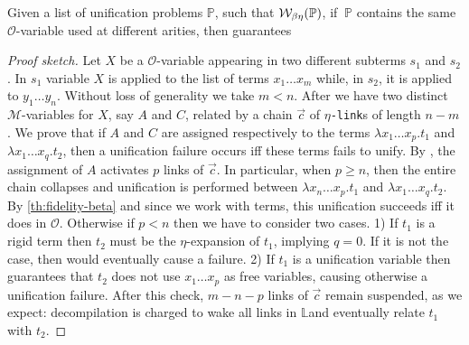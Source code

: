 \documentclass[sigconf,natbib=false,review]{acmart}
\newcommand{\linkMacro}[1]{\ensuremath{#1}\texttt{-link}\xspace}
\newcommand{\linketa} {\linkMacro{\eta}}
\newcommand{\Fo}{\texorpdfstring{\ensuremath{\mathcal{O}}\xspace}{O}}
\newcommand{\Ho}{\texorpdfstring{\ensuremath{\mathcal{M}}\xspace}{M}}
\newcommand{\linkStore}{\texorpdfstring{\ensuremath{\mathbb{L}}\xspace}{L}}
\newcommand{\foUnifPb}{\ensuremath{\mathbb{P}}\xspace}
\begin{document}
\begin{theorem}
  Given a list of unification problems \foUnifPb, such that 
  $\wellb_{\beta \eta}(\foUnifPb)$,
  if $\ \foUnifPb$ contains the same \Fo{}-variable used at different arities,
  then \mapdeduplication guarantees 
\end{theorem}

\def\chain{\ensuremath{\vec{c}}\xspace}

\begin{proof}[Proof sketch]
  Let $X$ be a \Fo{}-variable appearing in two different subterms $s_1$ and $s_2$.
  In $s_1$ variable $X$ is applied to the list of terms $x_1\dots x_m$ while, in $s_2$,
  it is applied to $y_1\dots y_n$. Without loss of generality we take $m < n$.
  After \mapdeduplication we have two distinct \Ho{}-variables for $X$, say $A$ and $C$,
  related by a chain \chain of \linketa{}s of length $n - m$. We prove that
  if $A$ and $C$ are assigned respectively to the \wellb terms $\lambda x_1\dots
  x_p.t_1$ and $\lambda x_1\dots x_q.t_2$, then a unification failure occurs iff
  these terms fails to unify. By \progressetaleft, the assignment of $A$
  activates $p$ links of \chain. In particular, when $p \geq n$, then the entire
  chain collapses and unification is performed between $\lambda x_n\dots
  x_p.t_1$ and $\lambda x_1\dots x_q.t_2$. By \cref{th:fidelity-beta} and since
  we work with \wellb terms, this unification succeeds iff it does in \Fo.
  Otherwise if $p < n$ then we have to consider two cases. 1) If $t_1$ is a rigid
  term then $t_2$ must be the $\eta$-expansion of $t_1$, implying $q = 0$. If it
  is not the case, then \progressetaleft
  would eventually cause a failure. 2) If $t_1$ is a
  unification variable then  guarantees that $t_2$ does not use
  $x_1\dots x_p$ as free variables, causing otherwise a unification failure.
  After this check, $m - n - p$ links of \chain remain suspended, as we expect:
  decompilation is charged to wake all links in \linkStore and eventually relate
  $t_1$ with $t_2$.

\end{proof}
\end{document}
